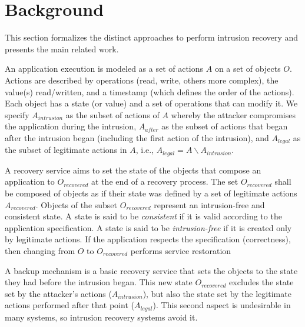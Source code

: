 
\section{Background}\label{sec:background}

This section formalizes the distinct approaches to perform intrusion recovery and presents the main related work. 

An application execution is modeled as a set of actions $A$ on a set of objects $O$. Actions are described by operations (read, write, others more complex), the value(s) read/written, and a timestamp (which defines the order of the actions). Each object has a state (or value) and a set of operations that can modify it. We specify $A_{intrusion}$ as the subset of actions of $A$ whereby the attacker compromises the application during the intrusion, $A_{after}$ as the subset of actions that began after the intrusion began (including the first action of the intrusion), and $A_{legal}$ as the subset of legitimate actions in $A$, i.e., $A_{legal} = A \backslash A_{intrusion}$.

A recovery service aims to set the state of the objects that compose an application to $O_{recovered}$ at the end of a recovery process. The set $O_{recovered}$ shall be composed of objects as if their state was defined by a set of legitimate actions $A_{recovered}$. Objects of the subset $O_{recovered}$ represent an intrusion-free and consistent state. A state is said to be \textit{consistent} if it is valid according to the application specification. A state is said to be \textit{intrusion-free} if it is created only by legitimate actions. If the application respects the specification (correctness), then changing from $O$ to $O_{recovered}$ performs service restoration %

A backup mechanism is a basic recovery service that sets the objects to the state they had before the intrusion began. This new state $O_{recovered}$ excludes the state set by the attacker's actions ($A_{intrusion}$), but also the state set by the legitimate actions performed after that point ($A_{legal}$). This second aspect is undesirable in many systems, so intrusion recovery systems avoid it.

